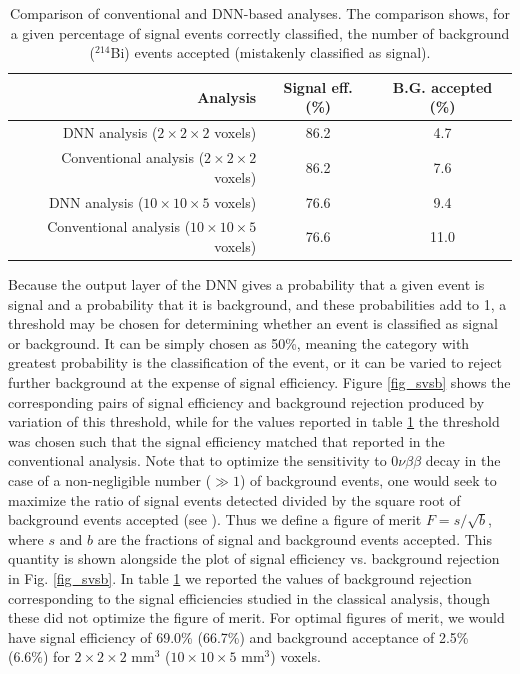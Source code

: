 \documentclass[a4paper,11pt]{article}
\begin{document}
\begin{table}[!htb]
	\begin{center}
		\caption[DNN analysis summary]{\label{tbl.DNNcomparison}Comparison of conventional and DNN-based analyses.  The comparison shows, for a given percentage of signal events
			correctly classified, the number of background ($^{214}$Bi) events accepted (mistakenly classified as signal).}
		\begin{tabular}{rcc}
			\\
			\textbf{Analysis} & \textbf{Signal eff. (\%)} & \textbf{B.G. accepted (\%)}\\
			\hline
			DNN analysis ($2 \times 2 \times 2$ voxels) & 86.2 & 4.7\\
			Conventional analysis ($2 \times 2 \times 2$ voxels) & 86.2 & 7.6\\
			\hline
			DNN analysis ($10 \times 10 \times 5$ voxels) & 76.6 & 9.4 \\
			Conventional analysis ($10 \times 10 \times 5$ voxels) & 76.6 & 11.0 \\
		\end{tabular}
	\end{center}
\end{table}

Because the output layer of the DNN gives a probability that a given event is signal and a probability that it is background, and these probabilities add to 1, a threshold may be 
chosen for determining whether an event is classified as signal or background.  It can be simply chosen as 50\%, meaning the category with greatest probability is the classification of the
event, or it can be varied to reject further background at the expense of signal efficiency.  Figure \ref{fig_svsb} shows the corresponding pairs of signal efficiency and background 
rejection produced by variation of this threshold, while for the values reported in table \ref{tbl.DNNcomparison} the threshold was chosen such that the signal efficiency matched that reported in 
the conventional analysis.  Note that to optimize the sensitivity to $0\nu\beta\beta$ decay in the case of a non-negligible number ($\gg 1$) of background events, one would seek to maximize 
the ratio of signal events detected divided by the square root of background events accepted (see \cite{Martin-Albo:2015rhw}).  Thus we define a figure of merit $F = s/\sqrt{b}$, where $s$ and 
$b$ are the fractions of signal and background events accepted.  
This quantity is shown alongside the plot of signal efficiency vs. background rejection in Fig. \ref{fig_svsb}.  In table \ref{tbl.DNNcomparison} we reported the values of background rejection 
corresponding to the signal efficiencies studied in the classical analysis, though these did not optimize the figure of merit.  For optimal figures of merit, we would have signal efficiency of 
69.0\% (66.7\%) and background acceptance of 2.5\% (6.6\%) for $2 \times 2 \times 2$ mm$^3$ ($10 \times 10 \times 5$ mm$^3$) voxels.
\end{document}
